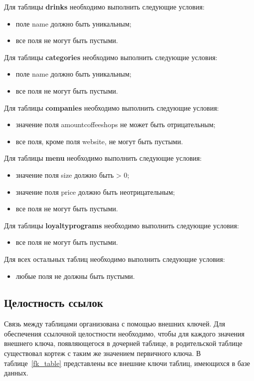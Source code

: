 Для таблицы \textbf{drinks} необходимо выполнить следующие условия:
 \begin{itemize}
 	\item поле name должно быть уникальным;
 	\item все поля не могут быть пустыми. %
 \end{itemize}
 
 Для таблицы \textbf{categories} необходимо выполнить следующие условия:
 \begin{itemize}
 	\item поле name должно быть уникальным;
 	\item все поля не могут быть пустыми. %
 \end{itemize}
 
Для таблицы \textbf{companies} необходимо выполнить следующие условия:
 \begin{itemize}
 	\item значение поля amountcoffeeshops не может быть отрицательным;
 	\item все поля, кроме поля website, не могут быть пустыми.%
 \end{itemize}
 
Для таблицы \textbf{menu} необходимо выполнить следующие условия:
\begin{itemize}
	\item значение поля size должно быть > 0;
	\item значение поля price должно быть неотрицательным;
	\item все поля не могут быть пустыми.

\end{itemize}

Для таблицы \textbf{loyaltyprograms} необходимо выполнить следующие условия:
\begin{itemize}
	\item все поля не могут быть пустыми. %
\end{itemize}

Для всех остальных таблиц необходимо выполнить следующие условия:
\begin{itemize} 
	\item любые поля не должны быть пустыми.%
\end{itemize}

\subsection{Целостность ссылок}
Связь между таблицами организована с помощью внешних ключей.
Для обеспечения ссылочной целостности необходимо, чтобы для каждого значения внешнего ключа, появляющегося в дочерней таблице, в родительской таблице существовал кортеж с таким же значением первичного ключа. В таблице~\ref{fk_table} представлены все внешние ключи таблиц, имеющихся в базе данных.


